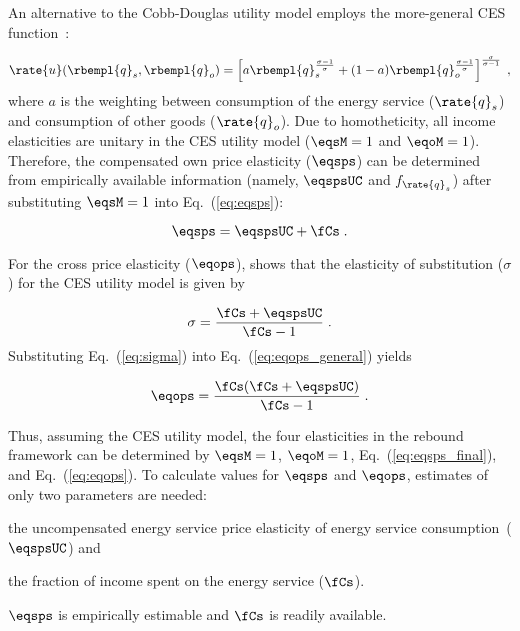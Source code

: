 An alternative to the Cobb-Douglas utility model employs 
the more-general CES function~\citep{Lemoine:2020aa}:

\begin{equation}
  \rate{u}(\rbempl{q}_s,\rbempl{q}_o) = 
      \left[ a \rbempl{q}_s^{\frac{\sigma-1}{\sigma}} 
            + (1-a) \rbempl{q}_o^{\frac{\sigma-1}{\sigma}} \right]                
                                   ^{\frac{\sigma}{\sigma-1}} \; ,
\end{equation}
%
where $a$ is the weighting between
consumption of the energy service ($\rate{q}_s$)
and consumption of other goods ($\rate{q}_o$).
Due to homotheticity,
all income elasticities are unitary in the CES utility model
($\eqsM = 1$ and $\eqoM = 1$).
Therefore,
the compensated own price elasticity ($\eqsps$) can be
determined from empirically available information
(namely, $\eqspsUC$ and $f_{\rate{q}_s}$)
after substituting $\eqsM = 1$ into Eq.~(\ref{eq:eqsps}):

\begin{equation} \label{eq:eqsps_final}
  \eqsps = \eqspsUC + \fCs \; .
\end{equation}

For the cross price elasticity ($\eqops$),
\citet{Gortz1977} shows that
the elasticity of substitution ($\sigma$)
for the CES utility model is given by

\begin{equation} \label{eq:sigma}
  \sigma  = \frac{\fCs + \eqspsUC}{\fCs - 1} \; . 
\end{equation}
%
Substituting Eq.~(\ref{eq:sigma}) into Eq.~(\ref{eq:eqops_general}) yields

\begin{equation} \label{eq:eqops}
  \eqops = \frac{\fCs (\fCs + \eqspsUC)}{\fCs - 1} \; .
\end{equation}

Thus, assuming the CES utility model,
the four elasticities in the rebound framework can be determined by
$\eqsM = 1$,
$\eqoM = 1$,
Eq.~(\ref{eq:eqsps_final}), and
Eq.~(\ref{eq:eqops}).
To calculate values for $\eqsps$ and $\eqops$, 
estimates of only two parameters are needed:
%
\begin{enumerate*}[label={(\alph*)}]

  \item the uncompensated energy service price elasticity of energy service consumption~($\eqspsUC$) and

  \item the fraction of income spent on the energy service ($\fCs$).

\end{enumerate*}
%
$\eqsps$ is empirically estimable and $\fCs$ is readily available.
